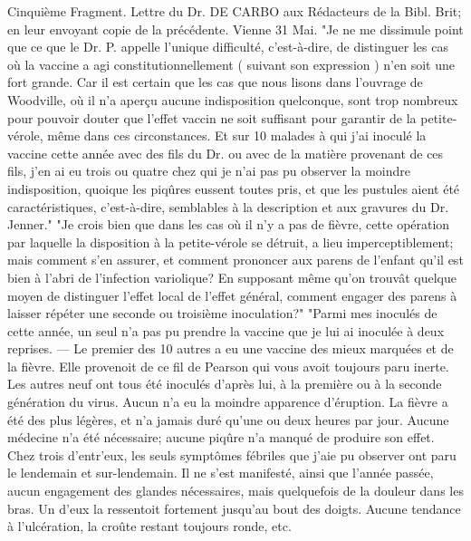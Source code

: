 Cinquième Fragment. Lettre du Dr. DE CARBO aux Rédacteurs de la Bibl. Brit; en leur envoyant copie de la précédente. Vienne 31 Mai.
"Je ne me dissimule point que ce que le Dr. P. appelle l'unique difficulté, c'est-à-dire, de distinguer les cas où la vaccine a agi constitutionnellement ( suivant son expression )\setcounter{page}{291} n'en soit une fort grande. Car il est certain que les cas que nous lisons dans l'ouvrage de Woodville, où il n'a aperçu aucune indisposition quelconque, sont trop nombreux pour pouvoir douter que l'effet vaccin ne soit suffisant pour garantir de la petite-vérole, même dans ces circonstances. Et sur 10 malades à qui j'ai inoculé la vaccine cette année avec des fils du Dr. ou avec de la matière provenant de ces fils, j'en ai eu trois ou quatre chez qui je n'ai pas pu observer la moindre indisposition, quoique les piqûres eussent toutes pris, et que les pustules aient été caractéristiques, c'est-à-dire, semblables à la description et aux gravures du Dr. Jenner."
"Je crois bien que dans les cas où il n'y a pas de fièvre, cette opération par laquelle la disposition à la petite-vérole se détruit, a lieu imperceptiblement; mais comment s'en assurer, et comment prononcer aux parens de l'enfant qu'il est bien à l'abri de l'infection variolique? En supposant même qu'on trouvât quelque moyen de distinguer l'effet local de l'effet général, comment engager des parens à laisser répéter une seconde ou troisième inoculation?"
"Parmi mes inoculés de cette année, un seul n'a pas pu prendre la vaccine que je lui ai inoculée à deux reprises. — Le premier\setcounter{page}{292} des 10 autres a eu une vaccine des mieux marquées et de la fièvre. Elle provenoit de ce fil de Pearson qui vous avoit toujours paru inerte. Les autres neuf ont tous été inoculés d'après lui, à la première ou à la seconde génération du virus. Aucun n'a eu la moindre apparence d'éruption. La fièvre a été des plus légères, et n'a jamais duré qu'une ou deux heures par jour. Aucune médecine n'a été nécessaire; aucune piqûre n'a manqué de produire son effet. Chez trois d'entr'eux, les seuls symptômes fébriles que j'aie pu observer ont paru le lendemain et sur-lendemain. Il ne s'est manifesté, ainsi que l'année passée, aucun engagement des glandes nécessaires, mais quelquefois de la douleur dans les bras. Un d'eux la ressentoit fortement jusqu'au bout des doigts. Aucune tendance à l'ulcération, la croûte restant toujours ronde, etc.
